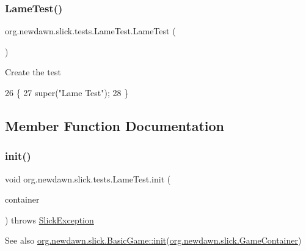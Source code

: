 \subsubsection{\texorpdfstring{Lame\+Test()}{LameTest()}}
{\footnotesize\ttfamily org.\+newdawn.\+slick.\+tests.\+Lame\+Test.\+Lame\+Test (\begin{DoxyParamCaption}{ }\end{DoxyParamCaption})\hspace{0.3cm}{\ttfamily [inline]}}

Create the test 
\begin{DoxyCode}
26                       \{
27         super(\textcolor{stringliteral}{"Lame Test"});
28     \}
\end{DoxyCode}


\subsection{Member Function Documentation}
\mbox{\label{classorg_1_1newdawn_1_1slick_1_1tests_1_1_lame_test_a0c30b1934e4bb18b4e3d228f159a37ff}} 
\subsubsection{\texorpdfstring{init()}{init()}}
{\footnotesize\ttfamily void org.\+newdawn.\+slick.\+tests.\+Lame\+Test.\+init (\begin{DoxyParamCaption}\item[{\mbox{\hyperlink{classorg_1_1newdawn_1_1slick_1_1_game_container}{Game\+Container}}}]{container }\end{DoxyParamCaption}) throws \mbox{\hyperlink{classorg_1_1newdawn_1_1slick_1_1_slick_exception}{Slick\+Exception}}\hspace{0.3cm}{\ttfamily [inline]}}

\begin{DoxySeeAlso}{See also}
\mbox{\hyperlink{classorg_1_1newdawn_1_1slick_1_1_basic_game_a8af0900217e4d389249f71367b22d114}{org.\+newdawn.\+slick.\+Basic\+Game\+::init}}(\mbox{\hyperlink{classorg_1_1newdawn_1_1slick_1_1_game_container}{org.\+newdawn.\+slick.\+Game\+Container}}) 
\end{DoxySeeAlso}


